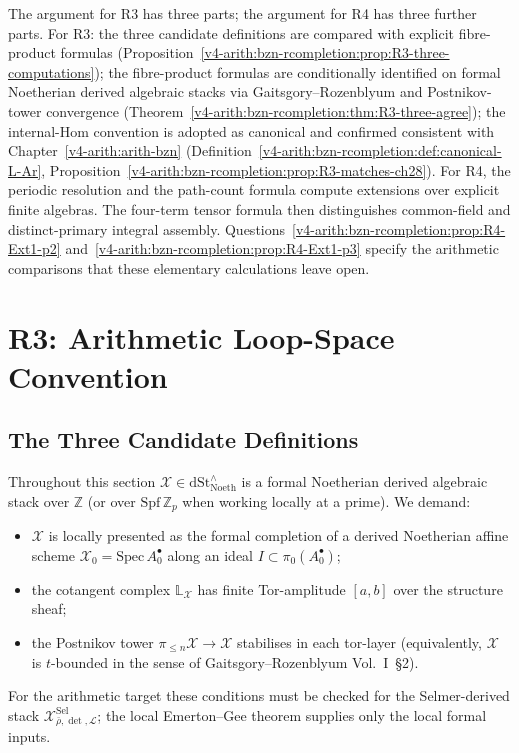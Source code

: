 The argument for R3 has three parts; the argument for R4 has three
further parts. For R3: the three candidate definitions are compared
with explicit fibre-product formulas
(Proposition~\ref{v4-arith:bzn-rcompletion:prop:R3-three-computations}); the fibre-product formulas
are conditionally identified on formal Noetherian derived algebraic
stacks via Gaitsgory--Rozenblyum and Postnikov-tower convergence
(Theorem~\ref{v4-arith:bzn-rcompletion:thm:R3-three-agree}); the internal-Hom convention is
adopted as canonical and confirmed consistent with Chapter~\ref{v4-arith:arith-bzn}
(Definition~\ref{v4-arith:bzn-rcompletion:def:canonical-L-Ar},
Proposition~\ref{v4-arith:bzn-rcompletion:prop:R3-matches-ch28}).
For R4, the periodic resolution and the path-count formula compute
extensions over explicit finite algebras. The four-term tensor
formula then distinguishes common-field and distinct-primary integral
assembly. Questions~\ref{v4-arith:bzn-rcompletion:prop:R4-Ext1-p2}
and~\ref{v4-arith:bzn-rcompletion:prop:R4-Ext1-p3} specify the
arithmetic comparisons that these elementary calculations leave open.

\section{R3: Arithmetic Loop-Space Convention}
\label{v4-arith:bzn-rcompletion:R3}

\subsection{The Three Candidate Definitions}

Throughout this section \(\mathcal{X}\in\mathrm{dSt}^{\wedge}_{\mathrm{Noeth}}\)
is a formal Noetherian derived algebraic stack over \(\mathbb{Z}\)
(or over \(\mathrm{Spf}\,\mathbb{Z}_{p}\) when working locally at a
prime). We demand:
\begin{itemize}
\item \(\mathcal{X}\) is locally presented as the formal completion
of a derived Noetherian affine scheme
\(\mathcal{X}_{0}=\mathrm{Spec}\,A_{0}^{\bullet}\) along an ideal
\(I\subset\pi_{0}(A_{0}^{\bullet})\);
\item the cotangent complex \(\mathbb{L}_{\mathcal{X}}\) has finite
Tor-amplitude \([a,b]\) over the structure sheaf;
\item the Postnikov tower \(\pi_{\leq n}\mathcal{X}\to\mathcal{X}\)
stabilises in each tor-layer (equivalently, \(\mathcal{X}\) is
\(t\)-bounded in the sense of Gaitsgory--Rozenblyum Vol.~I~\S2).
\end{itemize}
For the arithmetic target these conditions must be checked
for the Selmer-derived stack
\(\mathcal{X}^{\mathrm{Sel}}_{\bar\rho,\det,\mathcal{L}}\); the local
Emerton--Gee theorem supplies only the local formal inputs.

